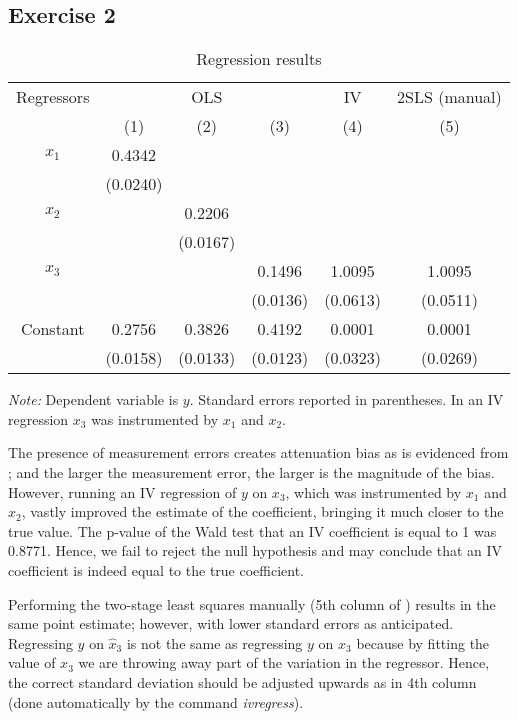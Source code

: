 \documentclass[]{article}
\begin{document}
\subsection*{Exercise 2}
\begin{table}[h]
	\begin{center}
		\begin{threeparttable}
			\begin{tabular}{c|ccccc}
				Regressors & \multicolumn{3}{c}{OLS} & IV & 2SLS (manual) \\
						& (1) 		& (2) 		& (3) 		& (4) 		& (5) 		\\ \hline
				$x_1$ 	& 0.4342 	&  			&  			&  			&  			\\
						& (0.0240) 	& 			&  			&  			&  			\\
				$x_2$ 	&  			& 0.2206 	&  			&  			&  			\\
						&  			& (0.0167) 	&  			&  			&  			\\
				$x_3$ 	&  			&  			& 0.1496 	& 1.0095 	& 1.0095 	\\
						&			&  			& (0.0136) 	& (0.0613) 	& (0.0511) 	\\
				Constant& 0.2756 	& 0.3826 	& 0.4192 	& 0.0001 	& 0.0001 	\\
						& (0.0158) 	& (0.0133) 	& (0.0123) 	& (0.0323) 	& (0.0269) 
			\end{tabular}
			\begin{tablenotes}
				\textit{Note: }Dependent variable is $y$. Standard errors reported in parentheses. In an IV regression $x_3$ was instrumented by $x_1$ and $x_2$.
			\end{tablenotes}
		\end{threeparttable}
	\end{center}
	\caption{Regression results}
	\label{tab:ex2regres}
\end{table}

The presence of measurement errors creates attenuation bias as is evidenced from ; and the larger the measurement error, the larger is the magnitude of the bias. However, running an IV regression of $y$ on $x_3$, which was instrumented by $x_1$ and $x_2$, vastly improved the estimate of the coefficient, bringing it much closer to the true value. The p-value of the Wald test that an IV coefficient is equal to 1 was 0.8771. Hence, we fail to reject the null hypothesis and may conclude that an IV coefficient is indeed equal to the true coefficient.

Performing the two-stage least squares manually (5th column of ) results in the same point estimate; however, with lower standard errors as anticipated. Regressing $y$ on $\hat{x}_3$ is not the same as regressing $y$ on $x_3$ because by fitting the value of $x_3$ we are throwing away part of the variation in the regressor. Hence, the correct standard deviation should be adjusted upwards as in 4th column (done automatically by the command \textit{ivregress}).
\end{document}
